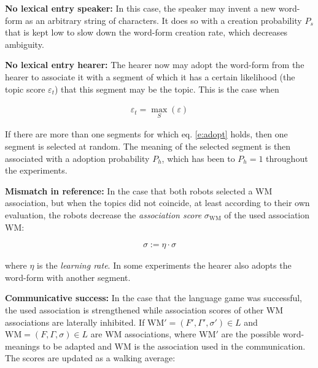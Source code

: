 \begin{description}
\item {\bf No lexical entry speaker:} In this case, the speaker may invent a new word-form as an arbitrary string of characters. It does so with a creation probability $P_s$ that is kept low to slow down the word-form creation rate, which decreases ambiguity.

\item {\bf No lexical entry hearer:} The hearer now may adopt the word-form from the hearer to associate it with a segment of which it has a certain likelihood (the topic score $\varepsilon_t$) that this segment may be the topic. This is the case when 

\begin{eqnarray}
\varepsilon_t = \max_S (\varepsilon)
\label{e:adopt}
\end{eqnarray}

\noindent
If there are more than one segments for which eq. \ref{e:adopt} holds, then one segment is selected at random. The meaning of the selected segment is then associated with a adoption probability $P_h$, which has been to $P_h=1$ throughout the experiments.

\item {\bf Mismatch in reference:} In the case that both robots selected a WM association, but when the topics did not coincide, at least according to their own evaluation, the robots decrease the {\em association score} $\sigma_{\mbox{WM}}$ of the used association $\mbox{WM}$:

\begin{eqnarray}
\sigma := \eta \cdot \sigma
\label{e:cm:adapt1}
\end{eqnarray}

\n
where $\eta$ is the {\em learning rate}. In some experiments the hearer also adopts the word-form with another segment.

\item {\bf Communicative success:} In the case that the language game was successful, the used association is strengthened while association scores of other WM associations are laterally inhibited. If $\mbox{WM}' = (F',\Gamma',\sigma') \in L$ and $\mbox{WM} = (F,\Gamma,\sigma) \in L$ are WM associations, where $\mbox{WM}'$ are the possible word-meanings to be adapted and $\mbox{WM}$ is the association used in the communication. The scores are updated as a walking average:


\end{description}
